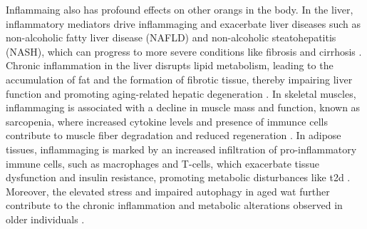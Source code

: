 \par Inflammaing also has profound effects on other orangs in the body. In the liver, inflammatory mediators drive inflammaging and exacerbate liver diseases such as non-alcoholic fatty liver disease (NAFLD) and non-alcoholic steatohepatitis (NASH), which can progress to more severe conditions like fibrosis and cirrhosis \textbf{\cite{jorquera_inflammaging_2022,li_inflammation_2023}}. Chronic inflammation in the liver disrupts lipid metabolism, leading to the accumulation of fat and the formation of fibrotic tissue, thereby impairing liver function and promoting aging-related hepatic degeneration \textbf{\cite{chung_advances_2021}}. In skeletal muscles, inflammaging is associated with a decline in muscle mass and function, known as sarcopenia, where increased cytokine levels and presence of immunce cells contribute to muscle fiber degradation and reduced regeneration \textbf{\cite{jorquera_inflammaging_2022,antuna_inflammaging_2022,jimenez-gutierrez_molecular_2022}}. In adipose tissues, inflammaging is marked by an increased infiltration of pro-inflammatory immune cells, such as macrophages and T-cells, which exacerbate tissue dysfunction and insulin resistance, promoting metabolic disturbances like \gls{t2d} \textbf{\cite{zamboni_how_2021}}. Moreover, the elevated  stress and impaired autophagy in aged \gls{wat} further contribute to the chronic inflammation and metabolic alterations observed in older individuals \textbf{\cite{ghosh_impaired_2016}}. 






